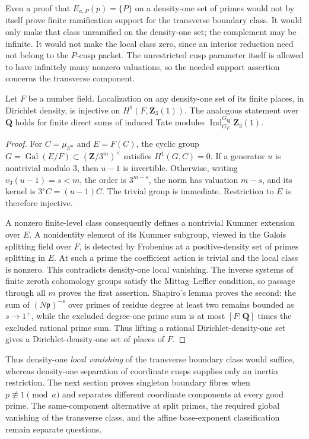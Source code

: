Even a proof that \(E_{a,P}(p)=\{P\}\) on a density-one set of primes
would not by itself prove finite ramification support for the
transverse boundary class. It would only make that class unramified on
the density-one set; the complement may be infinite. It would not make
the local class zero, since an interior reduction need not belong to
the \(P\)-cusp packet. The unrestricted cusp parameter itself is
allowed to have infinitely many nonzero valuations, so the needed
support assertion concerns the transverse component.

\begin{lemma}\label{lem:density-one-kummer-localization}
Let \(F\) be a number field. Localization on any density-one set of its
finite places, in Dirichlet density, is injective on \(H^1(F,\mathbf Z_3(1))\). The analogous
statement over \(\mathbf Q\) holds for finite direct sums of induced
Tate modules
\(\operatorname{Ind}_{G_F}^{G_{\mathbf Q}}\mathbf Z_3(1)\).
\end{lemma}
\begin{proof}
For \(C=\mu_{3^m}\) and \(E=F(C)\), the cyclic group
\(G=\operatorname{Gal}(E/F)\subset(\mathbf Z/3^m)^\times\) satisfies
\(H^1(G,C)=0\). If a generator \(u\) is nontrivial modulo \(3\), then
\(u-1\) is invertible. Otherwise, writing
\(v_3(u-1)=s<m\), the order is \(3^{m-s}\), the norm has valuation
\(m-s\), and its kernel is \(3^sC=(u-1)C\). The trivial group is
immediate. Restriction to \(E\) is therefore injective.

A nonzero finite-level class consequently defines a nontrivial
Kummer extension over \(E\). A nonidentity element of its Kummer
subgroup, viewed in the Galois splitting field over \(F\), is detected
by Frobenius at a positive-density set of primes splitting in \(E\).
At such a prime the coefficient action is trivial and the local
class is nonzero. This contradicts density-one local vanishing.
The inverse systems of finite zeroth cohomology groups satisfy the Mittag--Leffler condition, so passage through all \(m\) proves the first assertion. Shapiro's lemma
proves the second: the sum of $(N\mathfrak p)^{-s}$ over primes of residue degree at least
two remains bounded as $s\to1^+$, while the excluded degree-one prime
sum is at most $[F:\mathbf Q]$ times the excluded rational prime sum.
Thus lifting a rational Dirichlet-density-one set gives a
Dirichlet-density-one set of places of $F$.
\end{proof}

Thus density-one \emph{local vanishing} of the transverse boundary
class would suffice, whereas density-one separation of coordinate
cusps supplies only an inertia restriction. The next section proves
singleton boundary fibres when \(p\not\equiv1\pmod a\) and separates
different coordinate components at every good prime. The
same-component alternative at split primes, the required global
vanishing of the transverse class, and the affine base-exponent
classification remain separate questions.
